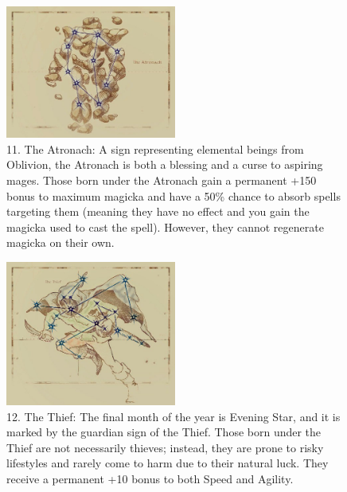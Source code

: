 \documentclass[12pt]{article}
\begin{document}
\begin{figure}[H]
\includegraphics[width=0.5\textwidth]{Atronach.png}
\centering
\caption*{11. The Atronach: A sign representing elemental beings from Oblivion, the Atronach is both a blessing and a curse to aspiring mages. Those born under the Atronach gain a permanent +150 bonus to maximum magicka and have a 50\% chance to absorb spells targeting them (meaning they have no effect and you gain the magicka used to cast the spell). However, they cannot regenerate magicka on their own.}
\end{figure}

\begin{figure}[H]
\includegraphics[width=0.5\textwidth]{Thief.png}
\centering
\caption*{12. The Thief: The final month of the year is Evening Star, and it is marked by the guardian sign of the Thief. Those born under the Thief are not necessarily thieves; instead, they are prone to risky lifestyles and rarely come to harm due to their natural luck. They receive a permanent +10 bonus to both Speed and Agility.}
\end{figure}
\end{document}
